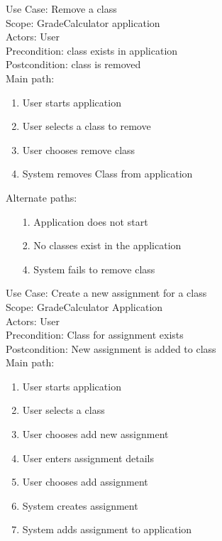 \documentclass[12pt]{article}
\begin{document}
\newpage

\noindent
Use Case: Remove a class \\

\noindent
Scope: GradeCalculator application \\

\noindent
Actors: User \\

\noindent
Precondition: class exists in application \\

\noindent
Postcondition: class is removed \\

\noindent
Main path:

\begin{enumerate}
	\item User starts application
	\item User selects a class to remove
	\item User chooses remove class
	\item System removes Class from application
\end{enumerate}

\noindent
Alternate paths:
\begin{enumerate}
	\item[1.] Application does not start
	\item[2.] No classes exist in the application
	\item[4.] System fails to remove class
\end{enumerate}

\newpage

\noindent
Use Case: Create a new assignment for a class \\

\noindent
Scope: GradeCalculator Application \\

\noindent
Actors: User \\

\noindent
Precondition: Class for assignment exists \\

\noindent
Postcondition: New assignment is added to class \\

\noindent
Main path:

\begin{enumerate}
	\item User starts application
	\item User selects a class
	\item User chooses add new assignment
	\item User enters assignment details
	\item User chooses add assignment
	\item System creates assignment
	\item System adds assignment to application
\end{enumerate}
\end{document}
